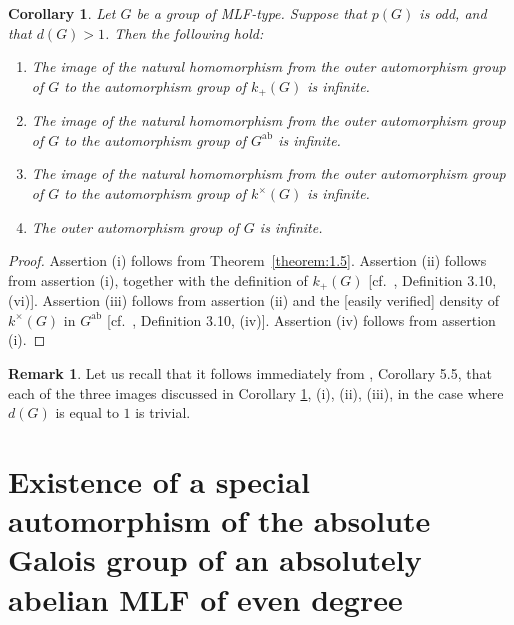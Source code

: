 \documentclass[12pt,showkeys]{amsart}
\theoremstyle{theorem}
\newtheorem{corollary}[theorem]{Corollary}
\theoremstyle{definition}
\newtheorem{remark}[theorem]{Remark}
\begin{document}
\begin{corollary}\label{corollary:2.12}
Let $G$ be a group of MLF-type.  
Suppose that $p(G)$ is odd, and that $d(G) > 1$.  
Then the following hold: 
\begin{enumerate}[label=(\roman*),ref=(\roman*)]
  \item[\rm (i)] The image of the natural homomorphism from the outer automorphism 
group of $G$ to the automorphism group of $k_+(G)$ is infinite. \label{corollary:2.12:statement:1}
  \item[\rm (ii)] The image of the natural homomorphism from the outer automorphism 
group of $G$ to the automorphism group of $G^{\mathrm{ab}}$ is infinite. \label{corollary:2.12:statement:2}
  \item[\rm (iii)] The image of the natural homomorphism from the outer automorphism 
group of $G$ to the automorphism group of $k^\times(G)$ is infinite. \label{corollary:2.12:statement:3}
  \item[\rm (iv)] The outer automorphism group of $G$ is infinite. \label{corollary:2.12:statement:4}
\end{enumerate}
\end{corollary}
\begin{proof}
Assertion (i) follows from Theorem~\ref{theorem:1.5}.  
Assertion (ii) follows from assertion (i), 
together with the definition of $k_+(G)$ 
[cf.\ \cite{Hoshi1}, Definition 3.10, (vi)].  
Assertion (iii) follows from assertion (ii) and 
the [easily verified] density of $k^\times(G)$ in $G^{\mathrm{ab}}$ 
[cf.\ \cite{Hoshi1}, Definition 3.10, (iv)].  
Assertion (iv) follows from assertion (i).  
\end{proof}

\begin{remark}\label{remark:2.13}
Let us recall that it follows immediately from 
\cite{Hoshi2}, Corollary 5.5, that each of the three images 
discussed in Corollary \ref{corollary:2.12}, 
(i), (ii), (iii), in the case where $d(G)$ is
equal to $1$ is trivial.
\end{remark}

\section{Existence of a special automorphism of the absolute Galois group of an absolutely abelian MLF of even degree}\label{section2}
\end{document}

